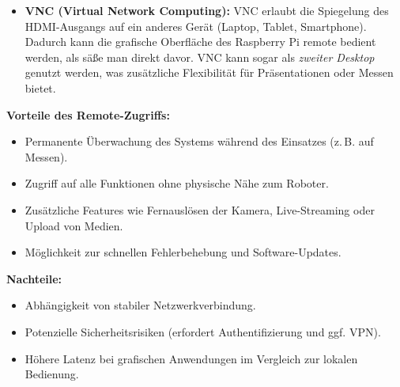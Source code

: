 \begin{itemize}
\begin{itemize}
		\item \textbf{VNC (Virtual Network Computing):} 
		VNC erlaubt die Spiegelung des HDMI-Ausgangs auf ein anderes Gerät (Laptop, Tablet, Smartphone). Dadurch kann die grafische Oberfläche des Raspberry Pi remote bedient werden, als säße man direkt davor. VNC kann sogar als \textit{zweiter Desktop} genutzt werden, was zusätzliche Flexibilität für Präsentationen oder Messen bietet.
	\end{itemize}
	
	\textbf{Vorteile des Remote-Zugriffs:}
	\begin{itemize}
		\item Permanente Überwachung des Systems während des Einsatzes (z.\,B. auf Messen).
		\item Zugriff auf alle Funktionen ohne physische Nähe zum Roboter.
		\item Zusätzliche Features wie Fernauslösen der Kamera, Live-Streaming oder Upload von Medien.
		\item Möglichkeit zur schnellen Fehlerbehebung und Software-Updates.
	\end{itemize}
	
	\textbf{Nachteile:}
	\begin{itemize}
		\item Abhängigkeit von stabiler Netzwerkverbindung.
		\item Potenzielle Sicherheitsrisiken (erfordert Authentifizierung und ggf. VPN).
		\item Höhere Latenz bei grafischen Anwendungen im Vergleich zur lokalen Bedienung.
	\end{itemize}
\end{itemize}


